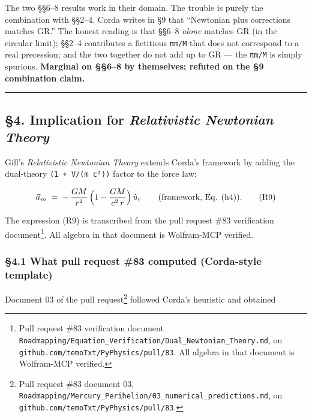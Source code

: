 \documentclass[
  11pt,
]{article}
\begin{document}
The two §§6--8 results work in their domain. The trouble is purely the
combination with §§2--4. Corda writes in §9 that ``Newtonian plus
corrections matches GR.'' The honest reading is that §§6--8 \emph{alone}
matches GR (in the circular limit); §§2--4 contributes a fictitious
\texttt{πm/M} that does not correspond to a real precession; and the two
together do not add up to GR --- the \texttt{πm/M} is simply spurious.
\textbf{Marginal on §§6--8 by themselves; refuted on the §9 combination
claim.}

\begin{center}\rule{0.5\linewidth}{0.5pt}\end{center}

\hypertarget{implication-for-relativistic-newtonian-theory}{%
\subsection{\texorpdfstring{§4. Implication for \emph{Relativistic
Newtonian
Theory}}{§4. Implication for Relativistic Newtonian Theory}}\label{implication-for-relativistic-newtonian-theory}}

Gill's \emph{Relativistic Newtonian Theory} extends Corda's framework by
adding the dual-theory \texttt{(1\ +\ V/(m\ c²))} factor to the force
law:

\[
\vec a_{m}
\;=\; -\,\frac{GM}{r^{2}}\,\Bigl(1 - \frac{GM}{c^{2}\,r}\Bigr)\,\hat u_{r}
\qquad\text{(framework, Eq. (h4)).}\tag{R9}
\]

The expression (R9) is transcribed from the pull request \#83
verification document\footnote{Pull request \#83 verification document
  \texttt{Roadmapping/Equation\_Verification/Dual\_Newtonian\_Theory.md},
  on \texttt{github.com/temoTxt/PyPhysics/pull/83}. All algebra in that
  document is Wolfram-MCP verified.}. All algebra in that document is
Wolfram-MCP verified.

\hypertarget{what-pull-request-83-computed-corda-style-template}{%
\subsubsection{§4.1 What pull request \#83 computed (Corda-style
template)}\label{what-pull-request-83-computed-corda-style-template}}

Document 03 of the pull request\footnote{Pull request \#83 document 03,
  \texttt{Roadmapping/Mercury\_Perihelion/03\_numerical\_predictions.md},
  on \texttt{github.com/temoTxt/PyPhysics/pull/83}.} followed Corda's
heuristic and obtained
\end{document}
